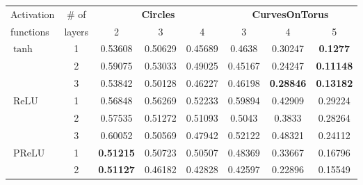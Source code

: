 \documentclass{esannV2}
\DeclareMathOperator{\relu}{\mathrm{ReLU}}
\DeclareMathOperator{\prelu}{\mathrm{PReLU}}
\begin{document}
\begin{table}[ht]
  \centering
  \scriptsize
  \begin{tabular}{|l|c|ccc|ccc|}
    \hline
    Activation         & \multicolumn{1}{c|}{\# of} & \multicolumn{3}{c|}{\textbf{Circles}} & \multicolumn{3}{c|}{\textbf{CurvesOnTorus}}                                                                             \\
    functions          & layers                     & 2                                     & 3                                           & 4                & 3                & 4                & 5                \\
    \hline
    $\tanh$            & 1                          & 0.53608                               & 0.50629                                     & 0.45689          & 0.4638           & 0.30247          & \textbf{0.1277}  \\
                       & 2                          & 0.59075                               & 0.53033                                     & 0.49025          & 0.45167          & 0.24247          & \textbf{0.11148} \\
                       & 3                          & 0.53842                               & 0.50128                                     & 0.46227          & 0.46198          & \textbf{0.28846} & \textbf{0.13182} \\
    \hline
    $\relu$            & 1                          & 0.56848                               & 0.56269                                     & 0.52233          & 0.59894          & 0.42909          & 0.29224          \\
                       & 2                          & 0.57535                               & 0.51272                                     & 0.51093          & 0.5043           & 0.3833           & 0.28264          \\
                       & 3                          & 0.60052                               & 0.50569                                     & 0.47942          & 0.52122          & 0.48321          & 0.24112          \\
    \hline
    $\prelu$           & 1                          & \textbf{0.51215}                      & 0.50723                                     & 0.50507          & 0.48369          & 0.33667          & 0.16796          \\
                       & 2                          & \textbf{0.51127}                      & 0.46182                                     & 0.42828          & 0.42597          & 0.22896          & 0.15549          \\

\end{tabular}
\end{table}
\end{document}
